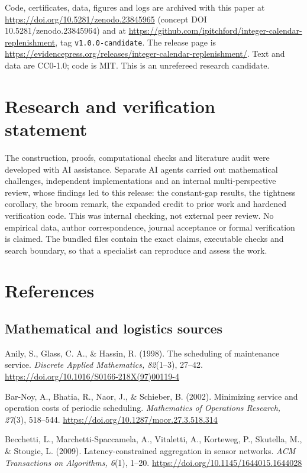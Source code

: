 \documentclass[
  british,
  11pt,
  a4paper,
]{article}
\begin{document}
Code, certificates, data, figures and logs are archived with this paper
at \url{https://doi.org/10.5281/zenodo.23845965} (concept DOI
10.5281/zenodo.23845964) and at
\url{https://github.com/ipitchford/integer-calendar-replenishment}, tag
\texttt{v1.0.0-candidate}. The release page is
\url{https://evidencepress.org/releases/integer-calendar-replenishment/}.
Text and data are CC0-1.0; code is MIT. This is an unrefereed research
candidate.

\section{Research and verification
statement}\label{research-and-verification-statement}

The construction, proofs, computational checks and literature audit were
developed with AI assistance. Separate AI agents carried out
mathematical challenges, independent implementations and an internal
multi-perspective review, whose findings led to this release: the
constant-gap results, the tightness corollary, the broom remark, the
expanded credit to prior work and hardened verification code. This was
internal checking, not external peer review. No empirical data, author
correspondence, journal acceptance or formal verification is claimed.
The bundled files contain the exact claims, executable checks and search
boundary, so that a specialist can reproduce and assess the work.

\clearpage

\section{References}\label{references}

\subsection{Mathematical and logistics
sources}\label{mathematical-and-logistics-sources}

Anily, S., Glass, C. A., \& Hassin, R. (1998). The scheduling of
maintenance service. \emph{Discrete Applied Mathematics, 82}(1--3),
27--42. \url{https://doi.org/10.1016/S0166-218X(97)00119-4}

Bar-Noy, A., Bhatia, R., Naor, J., \& Schieber, B. (2002). Minimizing
service and operation costs of periodic scheduling. \emph{Mathematics of
Operations Research, 27}(3), 518--544.
\url{https://doi.org/10.1287/moor.27.3.518.314}

Becchetti, L., Marchetti-Spaccamela, A., Vitaletti, A., Korteweg, P.,
Skutella, M., \& Stougie, L. (2009). Latency-constrained aggregation in
sensor networks. \emph{ACM Transactions on Algorithms, 6}(1), 1--20.
\url{https://doi.org/10.1145/1644015.1644028}
\end{document}
